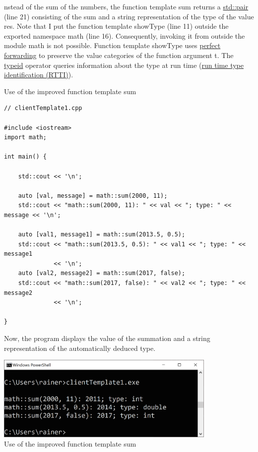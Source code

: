 nstead of the sum of the numbers, the function template sum returns a \href{https://en.cppreference.com/w/cpp/utility/pair}{std::pair} (line 21) consisting of the sum and a string representation of the type of the value res. Note that I put the function template showType (line 11) outside the exported namespace math (line 16). Consequently, invoking it from outside the module math is not possible. Function template showType uses \href{https://www.modernescpp.com/index.php/perfect-forwarding}{perfect forwarding} to preserve the value categories of the function argument t. The \href{https://en.cppreference.com/w/cpp/language/typeid}{typeid} operator queries information about the type at run time (\href{https://en.cppreference.com/w/cpp/types}{run time type identification (RTTI)}).

\noindent
Use of the improved function template sum
\begin{lstlisting}[style=styleCXX]
// clientTemplate1.cpp

#include <iostream>
import math;

int main() {
	
	std::cout << '\n';
	
	auto [val, message] = math::sum(2000, 11);
	std::cout << "math::sum(2000, 11): " << val << "; type: " << message << '\n';
	
	auto [val1, message1] = math::sum(2013.5, 0.5);
	std::cout << "math::sum(2013.5, 0.5): " << val1 << "; type: " << message1
			  << '\n';
	auto [val2, message2] = math::sum(2017, false);
	std::cout << "math::sum(2017, false): " << val2 << "; type: " << message2
			  << '\n';

}
\end{lstlisting}

Now, the program displays the value of the summation and a string representation of the automatically deduced type.

\begin{center}
\includegraphics[width=0.8\textwidth]{content/3/chapter4/images/25.png}\\
Use of the improved function template sum
\end{center}

